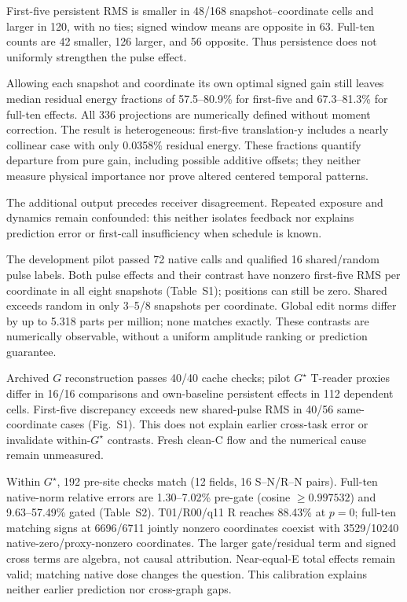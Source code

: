 \documentclass[conference]{IEEEtran}
\begin{document}
First-five persistent RMS is smaller in 48/168 snapshot--coordinate cells and larger in 120, with no ties; signed window means are opposite in 63. Full-ten counts are 42 smaller, 126 larger, and 56 opposite. Thus persistence does not uniformly strengthen the pulse effect.

Allowing each snapshot and coordinate its own optimal signed gain still leaves median residual energy fractions of 57.5--80.9\% for first-five and 67.3--81.3\% for full-ten effects. All 336 projections are numerically defined without moment correction. The result is heterogeneous: first-five translation-y includes a nearly collinear case with only 0.0358\% residual energy. These fractions quantify departure from pure gain, including possible additive offsets; they neither measure physical importance nor prove altered centered temporal patterns.



The additional output precedes receiver disagreement. Repeated exposure and dynamics remain confounded: this neither isolates feedback nor explains prediction error or first-call insufficiency when schedule is known.

The development pilot passed 72 native calls and qualified 16 shared/random pulse labels. Both pulse effects and their contrast have nonzero first-five RMS per coordinate in all eight snapshots (Table~S1); positions can still be zero. Shared exceeds random in only 3--5/8 snapshots per coordinate. Global edit norms differ by up to 5.318 parts per million; none matches exactly. These contrasts are numerically observable, without a uniform amplitude ranking or prediction guarantee.

Archived $G$ reconstruction passes 40/40 cache checks; pilot $G^\star$ T-reader proxies differ in 16/16 comparisons and own-baseline persistent effects in 112 dependent cells. First-five discrepancy exceeds new shared-pulse RMS in 40/56 same-coordinate cases (Fig.~S1). This does not explain earlier cross-task error or invalidate within-$G^\star$ contrasts. Fresh clean-C flow and the numerical cause remain unmeasured.

Within $G^\star$, 192 pre-site checks match (12 fields, 16 S--N/R--N pairs). Full-ten native-norm relative errors are 1.30--7.02\% pre-gate (cosine $\ge0.997532$) and 9.63--57.49\% gated (Table~S2). T01/R00/q11 R reaches 88.43\% at $p=0$; full-ten matching signs at 6696/6711 jointly nonzero coordinates coexist with 3529/10240 native-zero/proxy-nonzero coordinates. The larger gate/residual term and signed cross terms are algebra, not causal attribution. Near-equal-E total effects remain valid; matching native dose changes the question. This calibration explains neither earlier prediction nor cross-graph gaps.
\end{document}
